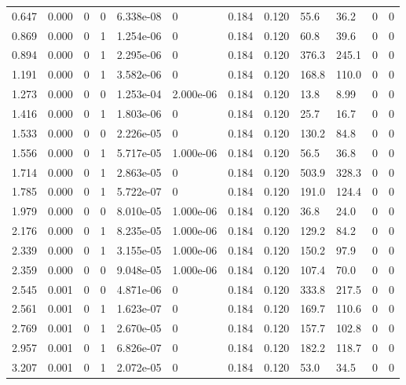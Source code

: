\documentclass[preview]{standalone}
\begin{document}
{{\begin{tabular}{L{1.2cm}C{1.2cm} C{0.3cm}C{0.5cm} C{1.4cm}C{1.4cm} C{1.4cm}C{1.4cm} C{1.6cm}C{1.6cm} C{1.6cm}C{1.6cm}}
  0.647  &  0.000  & 0     &  0 &  6.338e-08  & 0  &  0.184&   0.120& 55.6 & 36.2   &  0 & 0  \\ 
  0.869  &  0.000  & 0     &  1 &  1.254e-06  & 0  &  0.184&   0.120& 60.8 & 39.6   &  0 & 0  \\ 
  0.894  &  0.000  & 0     &  1 &  2.295e-06  & 0  &  0.184&   0.120& 376.3 & 245.1   &  0 & 0  \\ 
  1.191  &  0.000  & 0     &  1 &  3.582e-06  & 0  &  0.184&   0.120& 168.8 & 110.0   &  0 & 0  \\ 
  1.273  &  0.000  & 0     &  0 &  1.253e-04  & 2.000e-06  &  0.184&   0.120& 13.8 & 8.99   &  0 & 0  \\ 
  1.416  &  0.000  & 0     &  1 &  1.803e-06  & 0  &  0.184&   0.120& 25.7 & 16.7   &  0 & 0  \\ 
  1.533  &  0.000  & 0     &  0 &  2.226e-05  & 0  &  0.184&   0.120& 130.2 & 84.8   &  0 & 0  \\ 
  1.556  &  0.000  & 0     &  1 &  5.717e-05  & 1.000e-06  &  0.184&   0.120& 56.5 & 36.8   &  0 & 0  \\ 
  1.714  &  0.000  & 0     &  1 &  2.863e-05  & 0  &  0.184&   0.120& 503.9 & 328.3   &  0 & 0  \\ 
  1.785  &  0.000  & 0     &  1 &  5.722e-07  & 0  &  0.184&   0.120& 191.0 & 124.4   &  0 & 0  \\ 
  1.979  &  0.000  & 0     &  0 &  8.010e-05  & 1.000e-06  &  0.184&   0.120& 36.8 & 24.0   &  0 & 0  \\ 
  2.176  &  0.000  & 0     &  1 &  8.235e-05  & 1.000e-06  &  0.184&   0.120& 129.2 & 84.2   &  0 & 0  \\ 
  2.339  &  0.000  & 0     &  1 &  3.155e-05  & 1.000e-06  &  0.184&   0.120& 150.2 & 97.9   &  0 & 0  \\ 
  2.359  &  0.000  & 0     &  0 &  9.048e-05  & 1.000e-06  &  0.184&   0.120& 107.4 & 70.0   &  0 & 0  \\ 
  2.545  &  0.001  & 0     &  0 &  4.871e-06  & 0  &  0.184&   0.120& 333.8 & 217.5   &  0 & 0  \\ 
  2.561  &  0.001  & 0     &  1 &  1.623e-07  & 0  &  0.184&   0.120& 169.7 & 110.6   &  0 & 0  \\ 
  2.769  &  0.001  & 0     &  1 &  2.670e-05  & 0  &  0.184&   0.120& 157.7 & 102.8   &  0 & 0  \\ 
  2.957  &  0.001  & 0     &  1 &  6.826e-07  & 0  &  0.184&   0.120& 182.2 & 118.7   &  0 & 0  \\ 
  3.207  &  0.001  & 0     &  1 &  2.072e-05  & 0  &  0.184&   0.120& 53.0 & 34.5   &  0 & 0  \\ 

\end{tabular}}}
\end{document}
